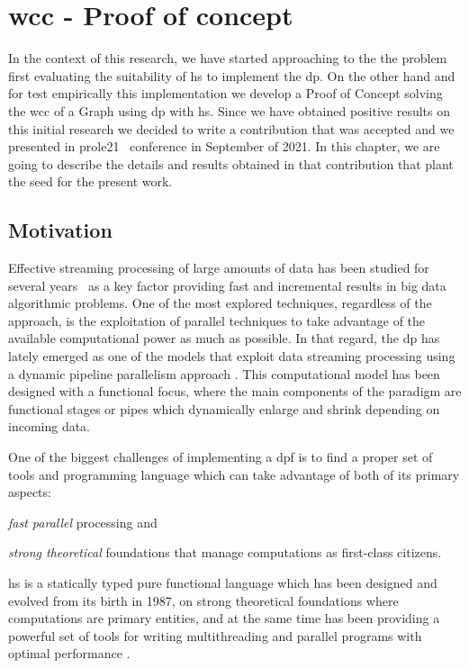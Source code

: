 \chapter{\acrshort{wcc} - Proof of concept}\label{prole}
In the context of this research, we have started approaching to the the problem first evaluating the suitability of \acrlong{hs}
to implement the \acrlong{dp}. On the other hand and for test empirically this implementation we develop a Proof of Concept solving 
the \acrlong{wcc} of a Graph using \acrlong{dp} with \acrshort{hs}.
Since we have obtained positive results on this initial research we decided to write a contribution that was accepted and we presented in \acrshort{prole21}~\cite{prole21} 
conference in September of 2021.
In this chapter, we are going to describe the details and results obtained in that contribution that plant the seed for the present work.

\section{Motivation}
Effective streaming processing of large amounts of data has been studied for several years~\cite{enumeratingsg, exploting, onthefly} as a key factor providing fast and incremental 
results in big data algorithmic problems. One of the most explored techniques, regardless of the approach, is the exploitation of parallel techniques to take advantage of the available 
computational power as much as possible. In that regard, the \acrfull{dp} \cite{dpdef} has lately emerged as one of the models that exploit data streaming processing using a dynamic pipeline parallelism approach \cite{onthefly}. 
This computational model has been designed with a functional focus, where the main components of the paradigm are functional stages or pipes which dynamically enlarge and shrink depending on incoming data.  

One of the biggest challenges of implementing a \acrfull{dpf} is to find a proper set of tools and programming language which can take advantage of both of its primary aspects: \begin{inparaenum}[i\upshape)]
\item  \emph{fast parallel} processing and 
\item  \emph{strong theoretical} foundations that manage computations as first-class citizens.
 \end{inparaenum}
\acrfull{hs} is a statically typed pure functional language which has been designed and evolved from its birth in 1987, on strong theoretical foundations where computations are primary entities, 
and at the same time has been providing a powerful set of tools for writing multithreading and parallel programs with optimal performance \cite{parallelbook, monadpar}.

